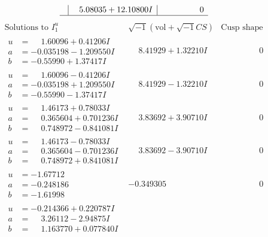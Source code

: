 \documentclass[1p]{elsarticle_modified}
\theoremstyle{definition}
\newcommand{\I}{\sqrt{-1}}
\begin{document}
$$\begin{array}{c|c|c}
 & \phantom{-}5.08035 + 12.10800 I & \phantom{-0.000000 } 0\\
 \hline 
 \end{array}$$\newpage$$\begin{array}{c|c|c}  
\text{Solutions to }I^u_{1}& \I (\text{vol} + \sqrt{-1}CS) & \text{Cusp shape}\\
 \hline 
\begin{aligned}
u &= \phantom{-}1.60096 + 0.41206 I \\
a &= -0.035198 - 1.209550 I \\
b &= -0.55990 + 1.37417 I\end{aligned}
 & \phantom{-}8.41929 + 1.32210 I & \phantom{-0.000000 } 0 \\ \hline\begin{aligned}
u &= \phantom{-}1.60096 - 0.41206 I \\
a &= -0.035198 + 1.209550 I \\
b &= -0.55990 - 1.37417 I\end{aligned}
 & \phantom{-}8.41929 - 1.32210 I & \phantom{-0.000000 } 0 \\ \hline\begin{aligned}
u &= \phantom{-}1.46173 + 0.78033 I \\
a &= \phantom{-}0.365604 + 0.701236 I \\
b &= \phantom{-}0.748972 - 0.841081 I\end{aligned}
 & \phantom{-}3.83692 + 3.90710 I & \phantom{-0.000000 } 0 \\ \hline\begin{aligned}
u &= \phantom{-}1.46173 - 0.78033 I \\
a &= \phantom{-}0.365604 - 0.701236 I \\
b &= \phantom{-}0.748972 + 0.841081 I\end{aligned}
 & \phantom{-}3.83692 - 3.90710 I & \phantom{-0.000000 } 0 \\ \hline\begin{aligned}
u &= -1.67712\phantom{ +0.000000I} \\
a &= -0.248186\phantom{ +0.000000I} \\
b &= -1.61998\phantom{ +0.000000I}\end{aligned}
 & -0.349305\phantom{ +0.000000I} & \phantom{-0.000000 } 0 \\ \hline\begin{aligned}
u &= -0.214366 + 0.220787 I \\
a &= \phantom{-}3.26112 - 2.94875 I \\
b &= \phantom{-}1.163770 + 0.077840 I\end{aligned}

\end{array}$$
\end{document}

